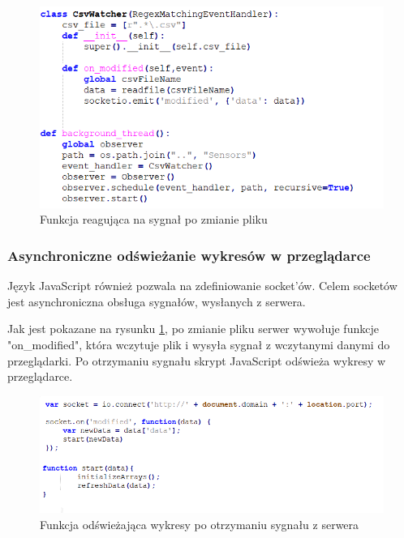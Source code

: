 \documentclass[a4paper]{article}
\begin{document}
    \begin{figure}[H]
        \centering
        \includegraphics{images/csvWatcher2.png}
        \caption{Funkcja reagująca na sygnał po zmianie pliku}
        \label{fig:mesh1}
    \end{figure}
    
    \subsubsection{Asynchroniczne odświeżanie wykresów w przeglądarce}
        
        Język JavaScript również pozwala na zdefiniowanie socket'ów. Celem socketów jest asynchroniczna obsługa sygnałów, wysłanych z serwera.
        
        Jak jest pokazane na rysunku \ref{fig:mesh1}, po zmianie pliku serwer wywołuje funkcje "on\_modified", która wczytuje plik i wysyła sygnał z wczytanymi danymi do przeglądarki.
        Po otrzymaniu sygnału skrypt JavaScript odświeża wykresy w przeglądarce.
        
        \begin{figure}[H]
            \centering
            \includegraphics{images/socketInJs.png}
            \caption{Funkcja odświeżająca wykresy po otrzymaniu sygnału z serwera}
        \end{figure}
        
\end{document}
